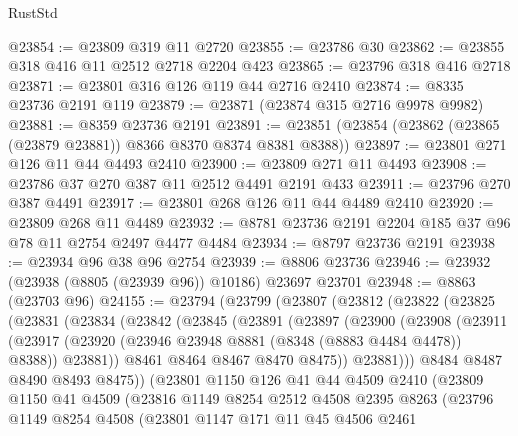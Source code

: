\begin{lexlean}{RustStd}
\begin{coremodule}
@23854 := @23809 @319 @11 @2720
@23855 := @23786 @30
@23862 := @23855 @318 @416 @11 @2512 @2718 @2204 @423
@23865 := @23796 @318 @416 @2718
@23871 := @23801 @316 @126 @119 @44 @2716 @2410
@23874 := @8335 @23736 @2191 @119
@23879 := @23871 (@23874 @315 @2716 @9978 @9982)
@23881 := @8359 @23736 @2191
@23891 := @23851 (@23854 (@23862 (@23865 (@23879 @23881)) @8366 @8370 @8374 @8381 @8388))
@23897 := @23801 @271 @126 @11 @44 @4493 @2410
@23900 := @23809 @271 @11 @4493
@23908 := @23786 @37 @270 @387 @11 @2512 @4491 @2191 @433
@23911 := @23796 @270 @387 @4491
@23917 := @23801 @268 @126 @11 @44 @4489 @2410
@23920 := @23809 @268 @11 @4489
@23932 := @8781 @23736 @2191 @2204 @185 @37 @96 @78 @11 @2754 @2497 @4477 @4484
@23934 := @8797 @23736 @2191
@23938 := @23934 @96 @38 @96 @2754
@23939 := @8806 @23736
@23946 := @23932 (@23938 (@8805 (@23939 @96)) @10186) @23697 @23701
@23948 := @8863 (@23703 @96)
@24155 := @23794
    (@23799
      (@23807
        (@23812
          (@23822
            (@23825
              (@23831
                (@23834
                  (@23842
                    (@23845
                      (@23891
                        (@23897
                          (@23900
                            (@23908
                              (@23911
                                (@23917
                                  (@23920 (@23946 @23948 @8881 (@8348 (@8883 @4484 @4478)) @8388))
                                  @23881))
                              @8461
                              @8464
                              @8467
                              @8470
                              @8475))
                          @23881)))
                    @8484
                    @8487
                    @8490
                    @8493
                    @8475))
                (@23801
                  @1150
                  @126
                  @41
                  @44
                  @4509
                  @2410
                  (@23809
                    @1150
                    @41
                    @4509
                    (@23816
                      @1149
                      @8254
                      @2512
                      @4508
                      @2395
                      @8263
                      (@23796
                        @1149
                        @8254
                        @4508
                        (@23801
                          @1147
                          @171
                          @11
                          @45
                          @4506
                          @2461

\end{coremodule}
\end{lexlean}
